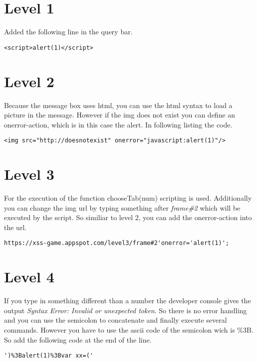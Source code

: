 

\section{Level 1}
Added the following line in the query bar.
\begin{lstlisting}
<script>alert(1)</script>
\end{lstlisting}


\section{Level 2}
Because the message box uses html, you can use the html syntax to load a picture in the message. However if the img does not exist you can define an onerror-action, which is in this case the alert. In following listing the code.
\begin{lstlisting}
<img src="http://doesnotexist" onerror="javascript:alert(1)"/>
\end{lstlisting}


\section{Level 3}
For the execution of the function chooseTab(num) scripting is used. Additionally you can change the img url by typing something after \textit{frame\#2} which will be executed by the script. So similiar to level 2, you can add the onerror-action into the url.
\begin{lstlisting}
https://xss-game.appspot.com/level3/frame#2'onerror='alert(1)';
\end{lstlisting}


\section{Level 4}
If you type in something different than a number the developer console gives the output \textit{Syntax Error: Invalid or unexpected token}. So there is no error handling and you can use the semicolon to concatenate and finally execute several commands. However you have to use the ascii code of the semicolon wich is \%3B.
So add the following code at the end of the line.

\begin{lstlisting}
')%3Balert(1)%3Bvar xx=('
\end{lstlisting}



